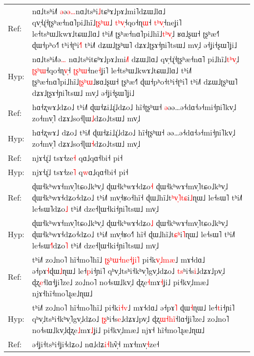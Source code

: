 \documentclass[10pt]{article}
\DeclareRobustCommand{\hl}[1]{{\textcolor{red}{#1}}}
\begin{document}
\begin{longtable}{ll}
\midrule 
Ref: & nɑ˩tsʰi˩˥\hl{ }\hl{ə}ə\hl{ə}\hl{…}nɑ˩tsʰi\hl{˩}tɕʰɤ˩pɤ˩mi˥dʑɯ˩lɑ˩ qv̩˧ɻ̍˧ʈʂʰæ˧nɑ˥pi˩hĩ˩\hl{ʈ}\hl{ʂ}\hl{ʰ}\hl{ɯ}˩ \hl{t}\hl{ʰ}\hl{v}\hl{̩}˧qo˧ɳ\hl{ɯ}˧ \hl{t}\hl{ʰ}\hl{v}\hl{̩}˧neʝi˥ le˧tsʰɯ˩kwɤ˩tɕɯ˩lɑ˩ tʰi˩˥ ʈʂʰæ˧nɑ˥pi˩hĩ˩\hl{t}\hl{ʰ}\hl{v}\hl{̩}˩\hl{ }ʁɑ˩ʂɯ˧ ʈʂʰæ˧˥ ɖɯ˧pʰo˧\hl{˥}\hl{ }tʰi˧ʈʰi\hl{˧}˥ tʰi˩˥ dʑɯ˩ʈʂʰɯ˥ dʑɤ˩ʈʂɤ˧ɲi˥tsɯ˩ mv̩˩ ə˧ʝi˧ʂɯ˥ʝi˩ \\ 
Hyp: & nɑ˩tsʰi˩˥ə\hl{…}\hl{ }nɑ˩tsʰitɕʰɤ˩pɤ˩mi\hl{˩}˥\hl{ }dʑɯ˩lɑ˩ qv̩˧ɻ̍˧ʈʂʰæ˧nɑ˥\hl{ }pi˩hĩ˩\hl{t}\hl{ʰ}\hl{v}\hl{̩}˩ \hl{ʈ}\hl{ʂ}\hl{ʰ}\hl{ɯ}˧qo˧ɳ\hl{v}\hl{̩}˧ \hl{ʈ}\hl{ʂ}\hl{ʰ}\hl{ɯ}˧ne\hl{˧}ʝi˥ le˧tsʰɯ˩kwɤ˩tɕɯ˩lɑ˩ tʰi˩˥ ʈʂʰæ˧nɑ˥pi˩hĩ˩\hl{ʈ}\hl{ʂ}\hl{ʰ}\hl{ɯ}˩ʁɑ˩ʂɯ˧ ʈʂʰæ˧˥ ɖɯ˧pʰo˧tʰi˧ʈʰi˥ tʰi˩˥ dʑɯ˩ʈʂʰɯ˥ dʑɤ˩ʈʂɤ˧ɲi˥tsɯ˩ mv̩˩ ə˧ʝi˧ʂɯ˥ʝi˩ \\ 
\midrule 
Ref: & hɑ˧ʐwɤ˩dʑo˩ tʰi˩˥ ɖɯ˧ʑi˩ɻ̍˩dʑo˩ hĩ˧ʈʂʰɯ˧ \hl{ə}əə…ə˧dɑ˧ə˧mi˧ɲi˥kv̩˩ zo˧mv̩˥ dʑɤ˩so˧ɭɯ\hl{˩}dʑo˩tsɯ˩ mv̩˩ \\ 
Hyp: & hɑ˧ʐwɤ˩\hl{ }dʑo˩ tʰi˩˥ ɖɯ˧ʑi˩ɻ̍˩dʑo˩ hĩ˧ʈʂʰɯ˧ əə…ə˧dɑ˧ə˧mi˧ɲi˥kv̩˩ zo˧mv̩˥ dʑɤ˩so˧ɭɯ\hl{˧}dʑo˩tsɯ˩ mv̩˩ \\ 
\midrule 
Ref: & njɤ˧ɻ̍˩ tsɤ˧ze\hl{˧} qɑ˩qɑ˧bi˧ pi˧ \\ 
Hyp: & njɤ˧ɻ̍˩ tsɤ˧ze\hl{˥} q\hl{w}ɑ˩qɑ˧bi˧ pi˧ \\ 
\midrule 
Ref: & ɖɯ˧kʰwɤ˧mv̩˥tɕo˩kʰv̩˩ ɖɯ˧kʰwɤ˧dʑo\hl{˧} ɖɯ˧kʰwɤ˧mv̩˥tɕo˩kʰv̩˩ ɖɯ˧kʰwɤ˧dʑo˧dʑo˩ tʰi˩˥ mv̩˧ʁo˧hĩ˧ ɖɯ˩hĩ˩t\hl{ʰ}\hl{v}\hl{̩}\hl{˥}\hl{t}\hl{ɕ}i\hl{˩}ɳɯ˩ le˧sɯ˥ tʰi˩˥ le˧sɯ˥dʑo\hl{˩} tʰi˩˥ dze˧ɭɯ˧ki˧ɲi˥tsɯ˩ mv̩˩ \\ 
Hyp: & ɖɯ˧kʰwɤ˧mv̩˥tɕo˩kʰv̩˩ ɖɯ˧kʰwɤ˧dʑo\hl{˩} ɖɯ˧kʰwɤ˧mv̩˥tɕo˩kʰv̩˩ ɖɯ˧kʰwɤ˧dʑo˧dʑo˩ tʰi˩˥ mv̩˧ʁo˧\hl{˥}\hl{ }hĩ˧ ɖɯ˩hĩ˩t\hl{ɕ}\hl{ʰ}i\hl{˥}ɳɯ˩ le˧sɯ˥ tʰi˩˥ le˧sɯ\hl{˧}˥dʑo\hl{˥} tʰi˩˥ dze˧ɭɯ˧ki˧ɲi˥tsɯ˩ mv̩˩ \\ 
\midrule 
Ref: & tʰi˩˥ zo˩no˥ hĩ˧mo˥hĩ˩ \hl{ʈ}\hl{ʂ}\hl{ʰ}\hl{ɯ}\hl{˧}\hl{n}\hl{e}\hl{˧}\hl{ʝ}\hl{i}\hl{˥}\hl{ }pi˧k\hl{v}\hl{̩}\hl{˩}\hl{m}\hl{æ}˩ mɤ˧dɑ˩ ə˧pɤ\hl{˧}ɖɯ\hl{˩}ɳɯ˩ le˧\hl{p}i˧ɲi˥ qʰv̩˩tsʰi˧kʰv̩˥gv̩˩dʑo˩ \hl{t}\hl{s}ʰi˧s\hl{i}˩dʑɤ˩pv̩˩ ɖʐ\hl{e}˧lɑ˧ʝi˥ze˩ zo˩no˥ no˧sɯ˩kv̩˩\hl{ }ɖʐe\hl{˧}mɤ\hl{˧}ʝi˩ pi˧kv̩˩mæ˩ njɤ˧hĩ˧mo˥ɻæ˩ɳɯ˩ \\ 
Hyp: & tʰi˩˥ zo˩no˥ hĩ˧mo˥hĩ˩ pi˧k\hl{i}\hl{˧}\hl{v}˩ mɤ˧dɑ˩ ə˧pɤ\hl{˥}\hl{ }ɖɯ\hl{˧}ɳɯ˩ le˧\hl{t}i˧ɲi˥ qʰv̩˩tsʰi˧kʰv̩˥gv̩˩dʑo˩ \hl{ʈ}\hl{ʂ}ʰi˧s\hl{e}˩dʑɤ˩pv̩˩ ɖʐ\hl{ɯ}\hl{˧}\hl{h}\hl{i}\hl{̃}˧lɑ˧ʝi˥ze˩ zo˩no˥ no˧sɯ˩kv̩˩ɖʐe\hl{˩}mɤ\hl{˩}ʝi˩ pi˧kv̩˩mæ˩ njɤ˧\hl{ }hĩ˧mo˥ɻæ˩ɳɯ˩ \\ 
\midrule 
Ref: & ə˧ʝi˧tsʰi˧ʝi˧dʑo˩ nɑ˩dʑ\hl{i}\hl{˧}hṽ\hl{̩}˧ mɤ˧mv̩\hl{˧}ze˧ \\ 

\end{longtable}
\end{document}
